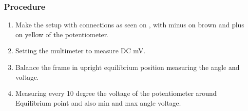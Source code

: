 \subsubsection{Procedure}
\begin{enumerate}
  \item Make the setup with connections as seen on , with minus on brown and plus on yellow of the potentiometer.
  \item Setting the multimeter to measure DC mV.
  \item Balance the frame in upright equilibrium position measuring the angle and voltage.
  \item Measuring every 10 degree the voltage of the potentiometer around Equilibrium point and also min and max angle voltage.
\end{enumerate}


